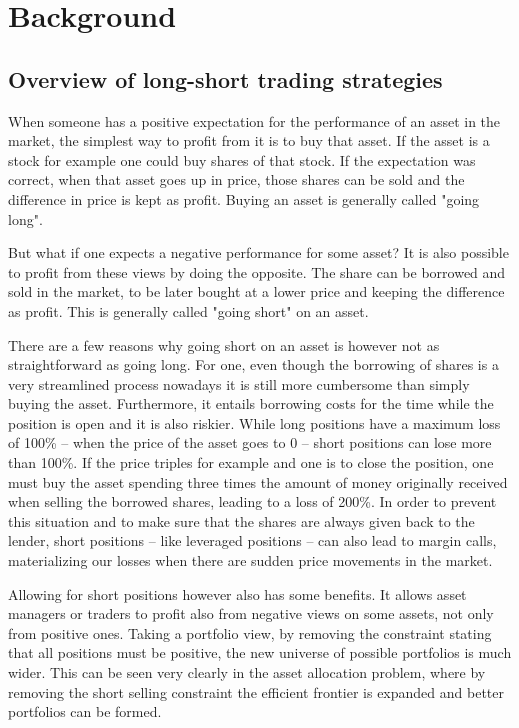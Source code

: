 \section{Background}
\subsection{Overview of long-short trading strategies}
When someone has a positive expectation for the performance of an asset in the market, the simplest way to profit from it is to buy that asset. If the asset is a stock for example one could buy shares of that stock. If the expectation was correct, when that asset goes up in price, those shares can be sold and the difference in price is kept as profit. Buying an asset is generally called "going long".

But what if one expects a negative performance for some asset? It is also possible to profit from these views by doing the opposite. The share can be borrowed and sold in the market, to be later bought at a lower price and keeping the difference as profit. This is generally called "going short" on an asset.

There are a few reasons why going short on an asset is however not as straightforward as going long. For one, even though the borrowing of shares is a very streamlined process nowadays it is still more cumbersome than simply buying the asset. Furthermore, it entails borrowing costs for the time while the position is open and it is also riskier. While long positions have a maximum loss of 100\% -- when the price of the asset goes to 0 -- short positions can lose more than 100\%. If the price triples for example and one is to close the position, one must buy the asset spending three times the amount of money originally received when selling the borrowed shares, leading to a loss of 200\%. In order to prevent this situation and to make sure that the shares are always given back to the lender, short positions -- like leveraged positions --  can also lead to margin calls, materializing our losses when there are sudden price movements in the market.

Allowing for short positions however also has some benefits. It allows asset managers or traders to profit also from negative views on some assets, not only from positive ones. Taking a portfolio view, by removing the constraint stating that all positions must be positive, the new universe of possible portfolios is much wider. This can be seen very clearly in the asset allocation problem, where by removing the short selling constraint the efficient frontier is expanded and better portfolios can be formed. 

